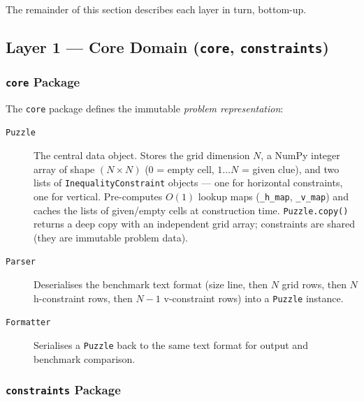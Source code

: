 The remainder of this section describes each layer in turn, bottom-up.

\subsection{Layer 1 — Core Domain (\texttt{core}, \texttt{constraints})}
\label{sec:layer_core}

\subsubsection{\texttt{core} Package}

The \texttt{core} package defines the immutable \emph{problem representation}:

\begin{description}
  \item[\texttt{Puzzle}] The central data object.
    Stores the grid dimension $N$, a NumPy integer array of shape $(N \times N)$
    (0 = empty cell, $1 \ldots N$ = given clue), and two lists of
    \texttt{InequalityConstraint} objects — one for horizontal constraints,
    one for vertical.
    Pre-computes $O(1)$ lookup maps (\texttt{\_h\_map}, \texttt{\_v\_map})
    and caches the lists of given/empty cells at construction time.
    \texttt{Puzzle.copy()} returns a deep copy with an independent grid array;
    constraints are shared (they are immutable problem data).

  \item[\texttt{Parser}] Deserialises the benchmark text format
    (size line, then $N$ grid rows, then $N$ h-constraint rows,
    then $N-1$ v-constraint rows) into a \texttt{Puzzle} instance.

  \item[\texttt{Formatter}] Serialises a \texttt{Puzzle} back to the same
    text format for output and benchmark comparison.
\end{description}

\subsubsection{\texttt{constraints} Package}

